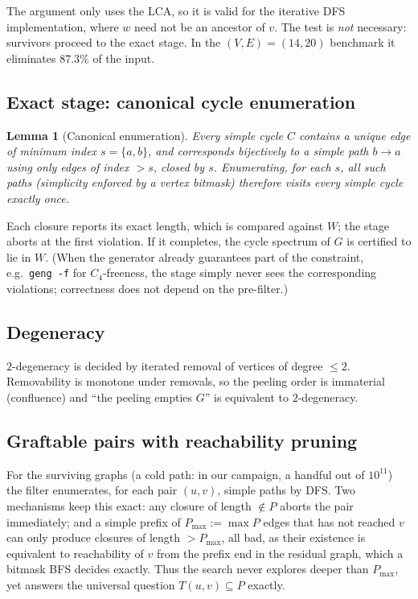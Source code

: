 \documentclass[11pt]{article}
\newtheorem{lemma}[theorem]{Lemma}
\begin{document}
The argument only uses the LCA, so it is valid for the iterative DFS
implementation, where $w$ need not be an ancestor of $v$. The test
is \emph{not} necessary: survivors proceed to the exact stage. In
the $(V,E)=(14,20)$ benchmark it eliminates $87.3\%$ of the input.

\subsection{Exact stage: canonical cycle enumeration}

\begin{lemma}[Canonical enumeration]
Every simple cycle $C$ contains a unique edge of minimum index
$s=\{a,b\}$, and corresponds bijectively to a simple path $b \to a$
using only edges of index $> s$, closed by $s$. Enumerating, for
each $s$, all such paths (simplicity enforced by a vertex bitmask)
therefore visits every simple cycle exactly once.
\end{lemma}

Each closure reports its exact length, which is compared against
$W$; the stage aborts at the first violation. If it completes, the
cycle spectrum of $G$ is certified to lie in $W$. (When the
generator already guarantees part of the constraint, e.g.\
\texttt{geng -f} for $C_4$-freeness, the stage simply never sees
the corresponding violations; correctness does not depend on the
pre-filter.)

\subsection{Degeneracy}

$2$-degeneracy is decided by iterated removal of vertices of degree
$\le 2$. Removability is monotone under removals, so the peeling
order is immaterial (confluence) and ``the peeling empties $G$'' is
equivalent to $2$-degeneracy.

\subsection{Graftable pairs with reachability pruning}

For the surviving graphs (a cold path: in our campaign, a handful
out of $10^{11}$) the filter enumerates, for each pair $(u,v)$,
simple paths by DFS. Two mechanisms keep this exact:
any closure of length $\notin P$ aborts the pair immediately; and a
simple prefix of $P_{\max} := \max P$ edges that has not reached $v$
can only produce closures of length $> P_{\max}$, all bad, as their
existence is equivalent to reachability of $v$ from the prefix end
in the residual graph, which a bitmask BFS decides exactly. Thus the
search never explores deeper than $P_{\max}$, yet answers the
universal question $T(u,v)\subseteq P$ exactly.
\end{document}
